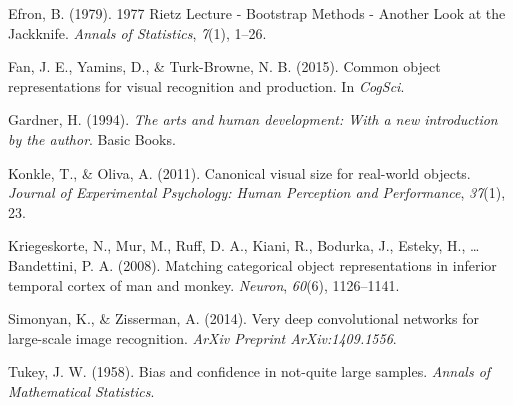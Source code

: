 \documentclass[10pt, letterpaper]{article}
\begin{document}
\hypertarget{ref-Efron:1979ts}{}
Efron, B. (1979). 1977 Rietz Lecture - Bootstrap Methods - Another Look
at the Jackknife. \emph{Annals of Statistics}, \emph{7}(1), 1--26.

\hypertarget{ref-fan2015common}{}
Fan, J. E., Yamins, D., \& Turk-Browne, N. B. (2015). Common object
representations for visual recognition and production. In \emph{CogSci}.

\hypertarget{ref-gardner1994arts}{}
Gardner, H. (1994). \emph{The arts and human development: With a new
introduction by the author}. Basic Books.

\hypertarget{ref-konkle2011canonical}{}
Konkle, T., \& Oliva, A. (2011). Canonical visual size for real-world
objects. \emph{Journal of Experimental Psychology: Human Perception and
Performance}, \emph{37}(1), 23.

\hypertarget{ref-kriegeskorte2008matching}{}
Kriegeskorte, N., Mur, M., Ruff, D. A., Kiani, R., Bodurka, J., Esteky,
H., \ldots{} Bandettini, P. A. (2008). Matching categorical object
representations in inferior temporal cortex of man and monkey.
\emph{Neuron}, \emph{60}(6), 1126--1141.

\hypertarget{ref-simonyan2014very}{}
Simonyan, K., \& Zisserman, A. (2014). Very deep convolutional networks
for large-scale image recognition. \emph{ArXiv Preprint
ArXiv:1409.1556}.

\hypertarget{ref-Tukey:1958wn}{}
Tukey, J. W. (1958). Bias and confidence in not-quite large samples.
\emph{Annals of Mathematical Statistics}.
\end{document}
